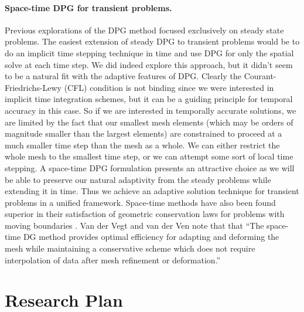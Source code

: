 \documentclass[letterpaper,12pt]{article}
\begin{document}
\paragraph{Space-time DPG for transient problems.}
Previous explorations of the DPG method focused exclusively on steady state problems.
The easiest extension of steady DPG to transient problems would be to do an implicit time stepping technique in time 
and use DPG for only the spatial solve at each time step.
We did indeed explore this approach, but it didn't seem to be a natural fit with the adaptive features of DPG.
Clearly the Courant-Friedrichs-Lewy (CFL) condition is not binding since we were interested in implicit time integration schemes, 
but it can be a guiding principle for temporal accuracy in this case.
So if we are interested in temporally accurate solutions, we are limited by the fact that our smallest mesh elements 
(which may be orders of magnitude smaller than the largest elements) are constrained to proceed at a much smaller time step than the mesh as a whole. 
We can either restrict the whole mesh to the smallest time step, or we can attempt some sort of local time stepping.
A space-time DPG formulation presents an attractive choice as we will be able to preserve our natural adaptivity 
from the steady problems while extending it in time.
Thus we achieve an adaptive solution technique for transient problems in a unified framework.
Space-time methods have also been found superior in their satisfaction of geometric conservation laws for problems with moving boundaries \cite{GCL}.
Van der Vegt and van der Ven \cite{vanderVegtEuler} note that that ``The space-time DG method provides optimal efficiency for adapting and deforming the mesh while maintaining a conservative scheme which does not require interpolation of data after mesh refinement or deformation.''

\section*{Research Plan}
\end{document}
